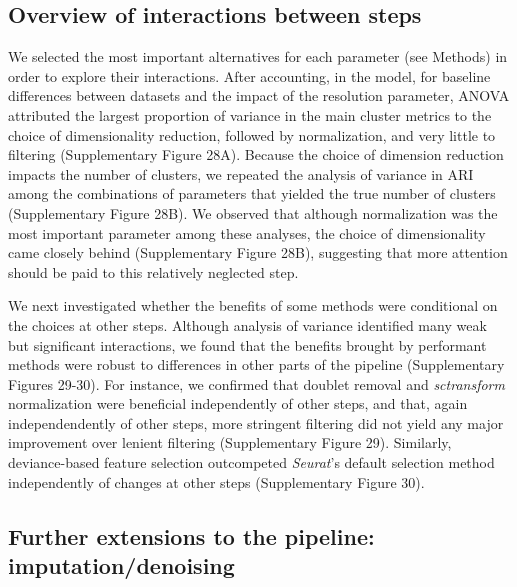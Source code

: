 \documentclass[11pt]{article}
\begin{document}
{\color{red}\subsection*{Overview of interactions between steps}

We selected the most important alternatives for each parameter (see Methods) in order to explore their interactions. After accounting, in the model, for baseline differences between datasets and the impact of the resolution parameter, ANOVA attributed the largest proportion of variance in the main cluster metrics to the choice of dimensionality reduction, followed by normalization, and very little to filtering (Supplementary Figure 28A). Because the choice of dimension reduction impacts the number of clusters, we repeated the analysis of variance in ARI among the combinations of parameters that yielded the true number of clusters (Supplementary Figure 28B). We observed that although normalization was the most important parameter among these analyses, the choice of dimensionality came closely behind (Supplementary Figure 28B), suggesting that more attention should be paid to this relatively neglected step.

We next investigated whether the benefits of some methods were conditional on the choices at other steps. Although analysis of variance identified many weak but significant interactions, we found that the benefits brought by performant methods were robust to differences in other parts of the pipeline (Supplementary Figures 29-30). For instance, we confirmed that doublet removal and \textit{sctransform} normalization were beneficial independently of other steps, and that, again independendently of other steps, more stringent filtering did not yield any major improvement over lenient filtering (Supplementary Figure 29). Similarly, deviance-based feature selection outcompeted \textit{Seurat}'s default selection method independently of changes at other steps (Supplementary Figure 30).}

\subsection*{Further extensions to the pipeline: imputation/denoising}
\end{document}
